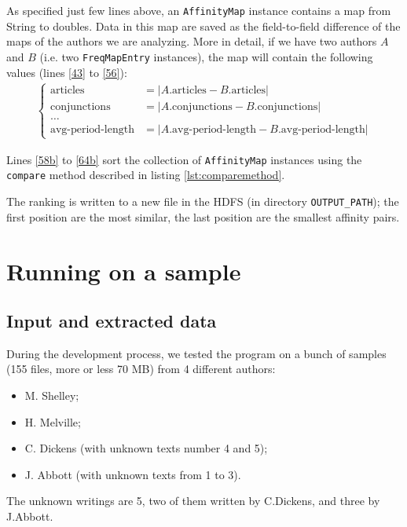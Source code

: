 \documentclass[a4paper,11pt, twoside]{article}
\begin{document}
 	\bigskip
 	\noindent
	As specified just few lines above, an \lstinline|AffinityMap| instance contains a map from String to doubles. Data in this map are saved as the field-to-field difference of the maps of the authors we are analyzing. More in detail, if we have two authors $A$ and $B$ (i.e. two \lstinline|FreqMapEntry| instances), the map will contain the following values (lines \ref{43} to \ref{56}):
	\begin{align*}
		\begin{cases}
			\text{articles} &= |A.\text{articles} - B.\text{articles}| \\
			\text{conjunctions} &= |A. \text{conjunctions}- B.\text{conjunctions}| \\
			\dots& \\
			\text{avg-period-length}&= |A.\text{avg-period-length} - B.\text{avg-period-length}|
		\end{cases}
	\end{align*}
	
	Lines \ref{58b} to \ref{64b} sort the collection of \lstinline|AffinityMap| instances using the \lstinline|compare| method described in listing \ref{lst:comparemethod}.
	
	The ranking is written to a new file in the HDFS (in directory \lstinline|OUTPUT_PATH|); the first position are the most similar, the last position are the smallest affinity pairs.

	
	\newpage
	\section{Running on a sample}
	\subsection{Input and extracted data}
	During the development process, we tested the program on a bunch of samples (155 files, more or less 70 MB) from 4 different authors: \begin{itemize}
		\item M. Shelley;
		\item H. Melville;
		\item C. Dickens (with unknown texts number 4 and 5);
		\item J. Abbott (with unknown texts from 1 to 3).
	\end{itemize}

	The unknown writings are 5, two of them written by C.Dickens, and three by J.Abbott.
	
\end{document}
